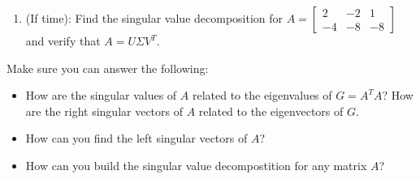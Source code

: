 \documentclass[12pt]{article}
\newcommand{\uvec}{{\mathbf u}}
\newcommand{\vvec}{{\mathbf v}}
\begin{document}
\begin{enumerate}
\begin{enumerate}
    \newpage
    \item In building the singular value decomposition, the matrices $U$ and $V$ will always be
orthogonal matrices so they must be square. The matrix $\Sigma$ will always have the
same shape as $A$; in this case, $\Sigma$ will be $2\times 3$. Find the singular values $\sigma_1$ and $\sigma_2$ of
$A$ and form $\Sigma = \left[\begin{array}{rrr}
     \sigma_1&0&0  \\
     0&\sigma_2&0 
\end{array}\right]$.
\vfill
\item Identify three right singular vectors $\vvec_1$, $\vvec_2$, and $\vvec_3$ and form the matrix $V$ having
these vectors as its columns.
\vfill
\item We now need to form the left singular vectors. If we want $A = U\Sigma V^T$, then the
matrix product $U\Sigma$ needs to make sense. This means that the number of columns of
$U$ equals the number of rows of $\Sigma$, which is 2. Therefore $U$ should be a $2\times 2$ matrix.
Find left singular vectors using $A\vvec_i = \sigma_i\uvec_i$.
\vfill
\item Form the matrix $U =\left[\uvec_1 \ \  \uvec_2\right]$. Then verify that $A=U\Sigma V^T$.

\vfill

\item How can you use this singular value decomposition of $A$
 to easily find a singular value decomposition of $A^T=\left[\begin{array}{rr}
      1&1  \\
      0&1\\ -1&1 
 \end{array}\right]$.
 \vfill
\end{enumerate}
\newpage

\item (If time): Find the singular value decomposition for $A=\left[\begin{array}{rrr}
     2&-2&1  \\
     -4&-8 &-8
\end{array}\right]$ and verify that $A=U\Sigma V^T$.



\end{enumerate}

\vfill


\begin{tcolorbox}
Make sure you can answer the following:
\begin{itemize}
\item How are the singular values of $A$ related to the eigenvalues of $G=A^TA$?  How are the right singular vectors of $A$ related to the eigenvectors of $G$.
\item How can you find the left singular vectors of $A$?
\item How can you build the singular value decompostition for any matrix $A$?
\end{itemize}

\end{tcolorbox}

    
\end{document}
